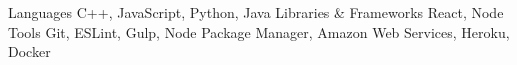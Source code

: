 \begin{cvhonors}
  \cvhonor
    {Languages}
    {C++, JavaScript, Python, Java}
    {}
    {}
  \cvhonor
    {Libraries \& Frameworks}
    {React, Node }
    {}
    {}
    \cvhonor
    {Tools}
    {Git, ESLint, Gulp, Node Package Manager, Amazon Web Services, Heroku, Docker}
    {}
    {}
\end{cvhonors}